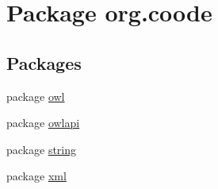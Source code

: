 \hypertarget{namespaceorg_1_1coode}{\section{Package org.\-coode}
\label{namespaceorg_1_1coode}
}
\subsection*{Packages}
\begin{DoxyCompactItemize}
\item 
package \hyperlink{namespaceorg_1_1coode_1_1owl}{owl}
\item 
package \hyperlink{namespaceorg_1_1coode_1_1owlapi}{owlapi}
\item 
package \hyperlink{namespaceorg_1_1coode_1_1string}{string}
\item 
package \hyperlink{namespaceorg_1_1coode_1_1xml}{xml}
\end{DoxyCompactItemize}
